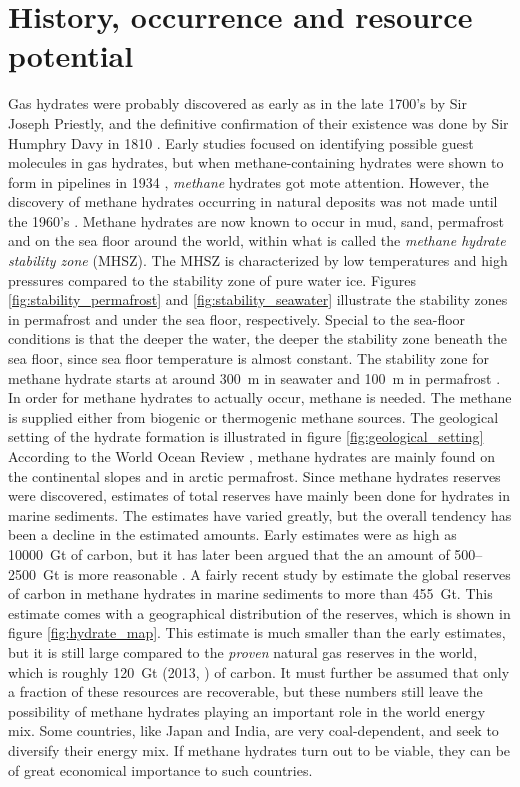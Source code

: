 \section{History, occurrence and resource potential}
Gas hydrates were probably discovered as early as in the late 1700's by Sir Joseph Priestly, and the definitive confirmation of their existence was done by Sir Humphry Davy in 1810 \cite{Hester2009}. Early studies focused on identifying possible guest molecules in gas hydrates, but when methane-containing hydrates were shown to form in pipelines in 1934 \cite{Hammerschmidt1934}, \emph{methane} hydrates got mote attention. However, the discovery of methane hydrates occurring in natural deposits was not made until the 1960's \cite{Makogon200714}. Methane hydrates are now known to occur in mud, sand, permafrost and on the sea floor around the world, within what is called the \emph{methane hydrate stability zone} (MHSZ). The MHSZ is characterized by low temperatures and high pressures compared to the stability zone of pure water ice. Figures \ref{fig:stability_permafrost} and \ref{fig:stability_seawater} illustrate the stability zones in permafrost and under the sea floor, respectively. Special to the sea-floor conditions is that the deeper the water, the deeper the stability zone beneath the sea floor, since sea floor temperature is almost constant. The stability zone for methane hydrate starts at around \SI{300}{\meter} in seawater and \SI{100}{\meter} in permafrost \cite{Hester2009}. In order for methane hydrates to actually occur, methane is needed. The methane is supplied either from biogenic or thermogenic methane sources. The geological setting of the hydrate formation is illustrated in figure \ref{fig:geological_setting} According to the World Ocean Review \cite{Bucker2014}, methane hydrates are mainly found on the continental slopes and in arctic permafrost.  Since methane hydrates reserves were discovered, estimates of total reserves have mainly been done for hydrates in marine sediments. The estimates have varied greatly, but the overall tendency has been a decline in the estimated amounts. Early estimates were as high as \SI{10000}{\giga\tonne} of carbon, but it has later been argued that the an amount of 500–\SI{2500}{\giga\tonne} is more reasonable \cite{Milkov2004183}. A fairly recent study by \citet{Wallmann2012} estimate the global reserves of carbon in methane hydrates in marine sediments to more than \SI{455}{\giga\tonne}. This estimate comes with a geographical distribution of the reserves, which is shown in figure \ref{fig:hydrate_map}. This estimate is much smaller than the early estimates, but it is still large compared to the \emph{proven} natural gas reserves in the world, which is roughly \SI{120}{\giga\tonne} (2013, \cite{CIA2013}) of carbon. It must further be assumed that only a fraction of these resources are recoverable, but these numbers still leave the possibility of methane hydrates playing an important role in the world energy mix. Some countries, like Japan and India, are very coal-dependent, and seek to diversify their energy mix. If methane hydrates turn out to be viable, they can be of great economical importance to such countries. 


